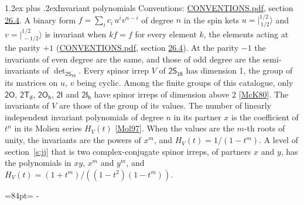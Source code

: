 \documentclass[10pt,a4paper]{article}
\makeatletter
\renewcommand\section{\@startsection{section}{1}{\z@}{-3ex plus -1ex minus -.2ex}%
  {1.2ex plus .2ex}{\normalfont\large\sffamily\bfseries\color{parttitle}}}
\newcommand{\needspace}[1]{\par\penalty-100\begingroup\dimen0=#1\relax\dimen2=\pagegoal
  \advance\dimen2-\pagetotal\ifdim\dimen0>\dimen2\relax\ifdim\dimen2>0pt\vfil\break\fi\fi
  \endgroup}
\numberwithin{equation}{section}
\newcommand{\grp}[1]{\mathsf{#1}}
\newcommand{\jm}[2]{\bigl\lvert{}^{#1}_{\,#2}\bigr\rangle}
\makeatother
\begin{document}
\section{Invariant polynomials}\label{s:invariants}
Conventions: \href{../../CONVENTIONS.pdf}{CONVENTIONS.pdf}, section \href{../../CONVENTIONS.pdf\#conv.26.4}{26.4}.
\leavevmode\label{n:local.binary.form}A binary form $f = \sum_i c_i\, u^i v^{n-i}$ of degree $n$ in the spin kets $u = \jm{1/2}{1/2}$ and $v = \jm{1/2}{-1/2}$ is invariant when $k f = f$ for every element $k$, the elements acting at the parity $+1$ (\href{../../CONVENTIONS.pdf}{CONVENTIONS.pdf}, section \href{../../CONVENTIONS.pdf\#conv.26.4}{26.4}). At the parity $-1$ the invariants of even degree are the same, and those of odd degree are the semi-invariants of $\det_{\grp{2S_{16}}}$.
\leavevmode\label{n:function.hilbert}Every spinor irrep $V$ of $\grp{2S_{16}}$ has dimension 1, the group of its matrices on $u$, $v$ being cyclic. Among the finite groups of this catalogue, only $\grp{2O}$, $\grp{2T_{d}}$, $\grp{2O_{h}}$, $\grp{2I}$ and $\grp{2I_{h}}$ have spinor irreps of dimension above 2 [\href{../../../REFERENCES.pdf\#ref.McK80}{McK80}]. The invariants of $V$ are those of the group of its values. \label{n:local.partner.x}The number of linearly independent invariant polynomials of degree $n$ in its partner $x$ is the coefficient of $t^n$ in its Molien series $H_V(t)$ [\href{../../../REFERENCES.pdf\#ref.Mol97}{Mol97}]. When the values are the $m$-th roots of unity, the invariants are the powers of $x^{m}$, and $H_V(t) = 1/(1 - t^{m})$. A level of section~\ref{s:jj} that is two complex-conjugate spinor irreps, of partners $x$ and $y$, has the polynomials in $xy$, $x^{m}$ and $y^{m}$, and $H_V(t) = (1 + t^{m})/((1 - t^{2})(1 - t^{m}))$.
\needspace{84pt}
\end{document}
